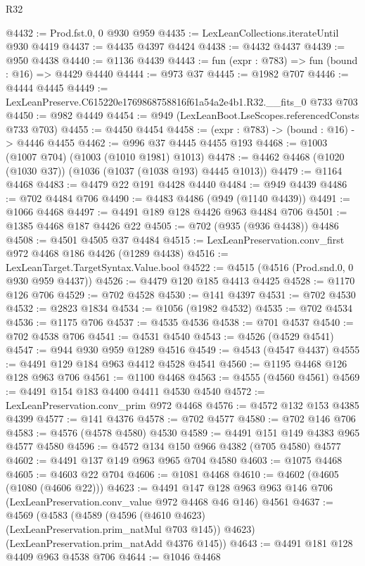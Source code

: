 \begin{lexlean}{R32}
\begin{coremodule}
@4432 := Prod.fst.{0, 0} @930 @959
@4435 := LexLeanCollections.iterateUntil @930 @4419
@4437 := @4435 @4397 @4424
@4438 := @4432 @4437
@4439 := @950 @4438
@4440 := @1136 @4439
@4443 := fun (expr : @783) => fun (bound : @16) => @4429 @4440
@4444 := @973 @37
@4445 := @1982 @707
@4446 := @4444 @4445
@4449 := LexLeanPreserve.C615220e1769868758816f61a54a2e4b1.R32.__fits_0 @733 @703
@4450 := @982 @4449
@4454 := @949 (LexLeanBoot.LseScopes.referencedConsts @733 @703)
@4455 := @4450 @4454
@4458 := (expr : @783) -> (bound : @16) -> @4446 @4455
@4462 := @996 @37 @4445 @4455 @193
@4468 := @1003 (@1007 @704) (@1003 (@1010 @1981) @1013)
@4478 := @4462 @4468 (@1020 (@1030 @37)) (@1036 (@1037 (@1038 @193) @4445 @1013))
@4479 := @1164 @4468
@4483 := @4479 @22 @191 @4428 @4440
@4484 := @949 @4439
@4486 := @702 @4484 @706
@4490 := @4483 @4486 (@949 (@1140 @4439))
@4491 := @1066 @4468
@4497 := @4491 @189 @128 @4426 @963 @4484 @706
@4501 := @1385 @4468 @187 @4426 @22
@4505 := @702 (@935 (@936 @4438)) @4486
@4508 := @4501 @4505 @37 @4484
@4515 := LexLeanPreservation.conv_first @972 @4468 @186 @4426 (@1289 @4438)
@4516 := LexLeanTarget.TargetSyntax.Value.bool
@4522 := @4515 (@4516 (Prod.snd.{0, 0} @930 @959 @4437))
@4526 := @4479 @120 @185 @4413 @4425
@4528 := @1170 @126 @706
@4529 := @702 @4528
@4530 := @141 @4397
@4531 := @702 @4530
@4532 := @2823 @1834
@4534 := @1056 (@1982 @4532)
@4535 := @702 @4534
@4536 := @1175 @706
@4537 := @4535 @4536
@4538 := @701 @4537
@4540 := @702 @4538 @706
@4541 := @4531 @4540
@4543 := @4526 (@4529 @4541)
@4547 := @944 @930 @959 @1289 @4516
@4549 := @4543 (@4547 @4437)
@4555 := @4491 @129 @184 @963 @4412 @4528 @4541
@4560 := @1195 @4468 @126 @128 @963 @706
@4561 := @1100 @4468
@4563 := @4555 (@4560 @4561)
@4569 := @4491 @154 @183 @4400 @4411 @4530 @4540
@4572 := LexLeanPreservation.conv_prim @972 @4468
@4576 := @4572 @132 @153 @4385 @4399
@4577 := @141 @4376
@4578 := @702 @4577
@4580 := @702 @146 @706
@4583 := @4576 (@4578 @4580) @4530
@4589 := @4491 @151 @149 @4383 @965 @4577 @4580
@4596 := @4572 @134 @150 @966 @4382 (@705 @4580) @4577
@4602 := @4491 @137 @149 @963 @965 @704 @4580
@4603 := @1075 @4468
@4605 := @4603 @22 @704
@4606 := @1081 @4468
@4610 := @4602 (@4605 (@1080 (@4606 @22)))
@4623 := @4491
    @147
    @128
    @963
    @963
    @146
    @706
    (LexLeanPreservation.conv_value @972 @4468 @46 @146)
    @4561
@4637 := @4569
    (@4583
      (@4589 (@4596 (@4610 @4623) (LexLeanPreservation.prim_natMul @703 @145)) @4623)
      (LexLeanPreservation.prim_natAdd @4376 @145))
@4643 := @4491 @181 @128 @4409 @963 @4538 @706
@4644 := @1046 @4468

\end{coremodule}
\end{lexlean}

